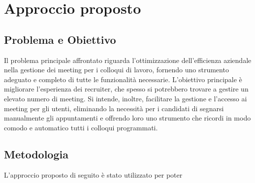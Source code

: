 \chapter{Approccio proposto}
 \section{Problema e Obiettivo}
 Il problema principale affrontato riguarda l'ottimizzazione dell'efficienza 
 aziendale nella gestione dei meeting per i colloqui di lavoro, fornendo uno 
 strumento adeguato e completo di tutte le funzionalità necessarie. 
 L'obiettivo principale è migliorare l'esperienza dei recruiter, che spesso si 
 potrebbero trovare a gestire un elevato numero di meeting. Si intende, inoltre, facilitare 
 la gestione e l'accesso ai meeting per gli utenti, eliminando la necessità per i 
 candidati di segnarsi manualmente gli appuntamenti e offrendo loro uno strumento 
 che ricordi in modo comodo e automatico tutti i colloqui programmati.

 \section{Metodologia}
 L'approccio proposto di seguito è stato utilizzato per poter 

